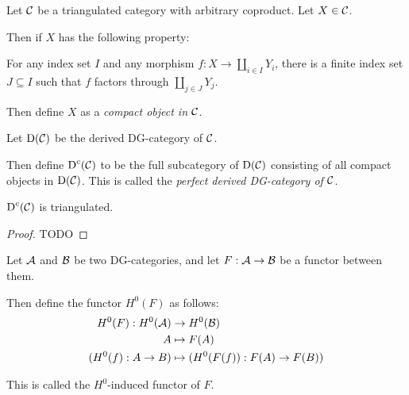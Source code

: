 
\begin{definition}
    Let \( {\mathcal{C}} \) be a triangulated category with arbitrary coproduct. Let \( X \in {\mathcal{C}} \). 
    
    Then if \( X \) has the following property:
    
    For any index set \( I \) and any morphism \( f: X \to \coprod_{i \in I} Y_i \), there is a finite index set \( J \subseteq I \) such that \( f \) factors through \( \coprod_{j \in J} Y_j \).
    
    Then define \( X \) as a \emph{compact object in \( {\mathcal{C}} \)}.
\end{definition}

\begin{definition}
    Let \( \operatorname{D}({\mathcal{C}}) \) be the derived DG-category of \( {\mathcal{C}} \).

    Then define \( \operatorname{D}^c({\mathcal{C}}) \) to be the full subcategory of \( \operatorname{D}({\mathcal{C}}) \) consisting of all compact objects in \( \operatorname{D}({\mathcal{C}}) \). This is called the \emph{perfect derived DG-category of \( {\mathcal{C}} \)}.
\end{definition}

\begin{proposition}
    \( \operatorname{D}^c({\mathcal{C}}) \) is triangulated.
\end{proposition}
\begin{proof}
    TODO
\end{proof}

\begin{definition}
    \label{def:H^0-induced_functor}
    Let \( {\mathcal{A}} \) and \( {\mathcal{B}} \) be two DG-categories, and let \( F: {\mathcal{A}} \to {\mathcal{B}} \) be a functor between them.

    Then define the functor \( H^0(F) \) as follows:
    \begin{align*}
        H^0(F): H^0({\mathcal{A}}) &\to H^0({\mathcal{B}}) \\
        A &\mapsto F(A) \\
        (H^0(f): A \to B) &\mapsto (H^0(F(f)): F(A) \to F(B)) 
    \end{align*}

    This is called the \( H^0 \)-induced functor of \( F \).
\end{definition}

